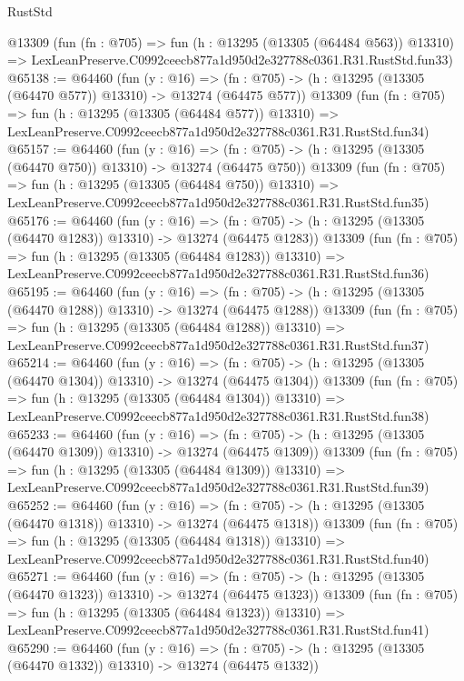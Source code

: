 \begin{lexlean}{RustStd}
\begin{coremodule}
    @13309
    (fun (fn : @705) =>
    fun (h : @13295 (@13305 (@64484 @563)) @13310) =>
    LexLeanPreserve.C0992ceecb877a1d950d2e327788c0361.R31.RustStd.fun33)
@65138 := @64460
    (fun (y : @16) =>
    (fn : @705) -> (h : @13295 (@13305 (@64470 @577)) @13310) -> @13274 (@64475 @577))
    @13309
    (fun (fn : @705) =>
    fun (h : @13295 (@13305 (@64484 @577)) @13310) =>
    LexLeanPreserve.C0992ceecb877a1d950d2e327788c0361.R31.RustStd.fun34)
@65157 := @64460
    (fun (y : @16) =>
    (fn : @705) -> (h : @13295 (@13305 (@64470 @750)) @13310) -> @13274 (@64475 @750))
    @13309
    (fun (fn : @705) =>
    fun (h : @13295 (@13305 (@64484 @750)) @13310) =>
    LexLeanPreserve.C0992ceecb877a1d950d2e327788c0361.R31.RustStd.fun35)
@65176 := @64460
    (fun (y : @16) =>
    (fn : @705) -> (h : @13295 (@13305 (@64470 @1283)) @13310) -> @13274 (@64475 @1283))
    @13309
    (fun (fn : @705) =>
    fun (h : @13295 (@13305 (@64484 @1283)) @13310) =>
    LexLeanPreserve.C0992ceecb877a1d950d2e327788c0361.R31.RustStd.fun36)
@65195 := @64460
    (fun (y : @16) =>
    (fn : @705) -> (h : @13295 (@13305 (@64470 @1288)) @13310) -> @13274 (@64475 @1288))
    @13309
    (fun (fn : @705) =>
    fun (h : @13295 (@13305 (@64484 @1288)) @13310) =>
    LexLeanPreserve.C0992ceecb877a1d950d2e327788c0361.R31.RustStd.fun37)
@65214 := @64460
    (fun (y : @16) =>
    (fn : @705) -> (h : @13295 (@13305 (@64470 @1304)) @13310) -> @13274 (@64475 @1304))
    @13309
    (fun (fn : @705) =>
    fun (h : @13295 (@13305 (@64484 @1304)) @13310) =>
    LexLeanPreserve.C0992ceecb877a1d950d2e327788c0361.R31.RustStd.fun38)
@65233 := @64460
    (fun (y : @16) =>
    (fn : @705) -> (h : @13295 (@13305 (@64470 @1309)) @13310) -> @13274 (@64475 @1309))
    @13309
    (fun (fn : @705) =>
    fun (h : @13295 (@13305 (@64484 @1309)) @13310) =>
    LexLeanPreserve.C0992ceecb877a1d950d2e327788c0361.R31.RustStd.fun39)
@65252 := @64460
    (fun (y : @16) =>
    (fn : @705) -> (h : @13295 (@13305 (@64470 @1318)) @13310) -> @13274 (@64475 @1318))
    @13309
    (fun (fn : @705) =>
    fun (h : @13295 (@13305 (@64484 @1318)) @13310) =>
    LexLeanPreserve.C0992ceecb877a1d950d2e327788c0361.R31.RustStd.fun40)
@65271 := @64460
    (fun (y : @16) =>
    (fn : @705) -> (h : @13295 (@13305 (@64470 @1323)) @13310) -> @13274 (@64475 @1323))
    @13309
    (fun (fn : @705) =>
    fun (h : @13295 (@13305 (@64484 @1323)) @13310) =>
    LexLeanPreserve.C0992ceecb877a1d950d2e327788c0361.R31.RustStd.fun41)
@65290 := @64460
    (fun (y : @16) =>
    (fn : @705) -> (h : @13295 (@13305 (@64470 @1332)) @13310) -> @13274 (@64475 @1332))

\end{coremodule}
\end{lexlean}
